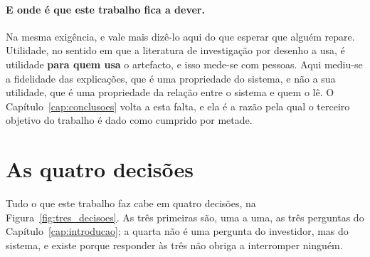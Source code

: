 \paragraph{E onde é que este trabalho fica a dever.} Na mesma exigência, e vale mais dizê-lo aqui
do que esperar que alguém repare. Utilidade, no sentido em que a literatura de investigação por
desenho a usa, é utilidade \textbf{para quem usa} o artefacto, e isso mede-se com pessoas. Aqui
mediu-se a fidelidade das explicações, que é uma propriedade do sistema, e não a sua utilidade,
que é uma propriedade da relação entre o sistema e quem o lê. O Capítulo~\ref{cap:conclusoes}
volta a esta falta, e ela é a razão pela qual o terceiro objetivo do trabalho é dado como cumprido
por metade.

\section{As quatro decisões}
\label{sec:met_tres}

Tudo o que este trabalho faz cabe em quatro decisões, na Figura~\ref{fig:tres_decisoes}. As três
primeiras são, uma a uma, as três perguntas do Capítulo~\ref{cap:introducao}; a quarta não é uma
pergunta do investidor, mas do sistema, e existe porque responder às três não obriga a interromper
ninguém.

